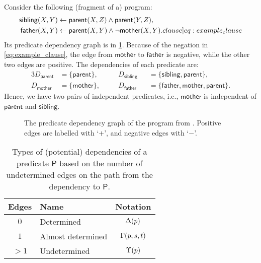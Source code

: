 \begin{example} \label{ex:program}
  Consider the following (fragment of a) program:
  \begin{align}
    \mathsf{sibling}(X, Y) &\gets \mathsf{parent}(X, Z) \land \mathsf{parent}(Y, Z), \nonumber \\
    \mathsf{father}(X, Y) &\gets \mathsf{parent}(X, Y) \land \neg\mathsf{mother}(X, Y). \label[clause]{eq:example_clause}
  \end{align}
  Its predicate dependency graph is in \cref{fig:predicate_dependencies}.
  Because of the negation in \eqref{eq:example_clause}, the edge from
  $\mathsf{mother}$ to $\mathsf{father}$ is negative, while the other two edges
  are positive. The dependencies of each predicate are:
  \begin{alignat*}{3}
    D_{\mathsf{parent}} &= \{ \mathsf{parent} \}, \quad && D_{\mathsf{sibling}}
    &&= \{\mathsf{sibling}, \mathsf{parent} \},\\
    D_{\mathsf{mother}} &= \{ \mathsf{mother} \}, \quad && D_{\mathsf{father}}
    &&= \{ \mathsf{father}, \mathsf{mother}, \mathsf{parent} \}.
  \end{alignat*}
  Hence, we have two pairs of independent predicates, i.e., $\mathsf{mother}$ is
  independent of $\mathsf{parent}$ and $\mathsf{sibling}$.
\end{example}

\begin{figure}
  \centering
  \caption{The predicate dependency graph of the program from
    . Positive edges are labelled with `$+$', and
    negative edges with `$-$'.}\label{fig:predicate_dependencies}
\end{figure}

\begin{table}
  \centering
  \begin{tabular}{clc}
    \toprule
    Edges & Name & Notation \\
    \midrule
    $0$ & Determined & $\operatorname{\Delta}(p)$ \\
    $1$ & Almost determined & $\operatorname{\Gamma}(p, s, t)$ \\
    $>1$ & Undetermined & $\operatorname{\Upsilon}(p)$ \\
    \bottomrule
  \end{tabular}
  \caption{Types of (potential) dependencies of a predicate $\mathsf{P}$ based
    on the number of undetermined edges on the path from the dependency to
    $\mathsf{P}$.}\label{tbl:dependencies}
\end{table}

